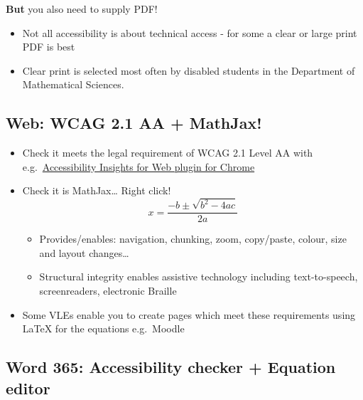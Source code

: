 \documentclass[
  17pt,
  english,
  a4paper]{extarticle}
\providecommand{\tightlist}{%
  \setlength{\itemsep}{0pt}\setlength{\parskip}{0pt}}
\theoremstyle{plain}
\theoremstyle{plain}
\theoremstyle{plain}
\theoremstyle{plain}
\theoremstyle{plain}
\theoremstyle{definition}
\theoremstyle{definition}
\theoremstyle{definition}
\theoremstyle{remark}
\renewcommand{\;}{\,}
\begin{document}
\textbf{But} you also need to supply PDF!

\begin{itemize}
\tightlist
\item
  Not all accessibility is about technical access - for some a clear or large print PDF is best
\item
  Clear print is selected most often by disabled students in the Department of Mathematical Sciences.
\end{itemize}

\hypertarget{web-wcag-2.1-aa-mathjax}{%
\subsection{Web: WCAG 2.1 AA + MathJax!}\label{web-wcag-2.1-aa-mathjax}}

\begin{itemize}
\item
  Check it meets the legal requirement of WCAG 2.1 Level AA with e.g.~\href{https://accessibilityinsights.io/docs/en/web/overview}{Accessibility Insights for Web plugin for Chrome}
\item
  Check it is MathJax\ldots{} Right click!
  \[x = \frac{-b\pm\sqrt{b^2 - 4ac}}{2a}\]

  \begin{itemize}
  \tightlist
  \item
    Provides/enables: navigation, chunking, zoom, copy/paste, colour, size and layout changes\ldots{}
  \item
    Structural integrity enables assistive technology including text-to-speech, screenreaders, electronic Braille
  \end{itemize}
\item
  Some VLEs enable you to create pages which meet these requirements using LaTeX for the equations e.g.~Moodle
\end{itemize}

\hypertarget{word-365-accessibility-checker-equation-editor}{%
\subsection{Word 365: Accessibility checker + Equation editor}\label{word-365-accessibility-checker-equation-editor}}
\end{document}
